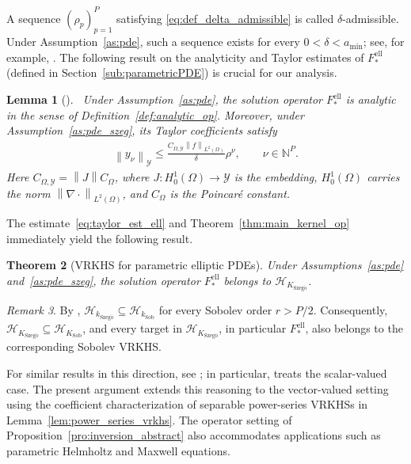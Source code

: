 \documentclass[11pt]{article}
\numberwithin{equation}{section}
\theoremstyle{plain}
\newtheorem{theorem}{Theorem}[section]
\newtheorem{lemma}[theorem]{Lemma}
\theoremstyle{definition}
\theoremstyle{remark}
\newtheorem{remark}[theorem]{Remark}
\newcommand{\Hs}{\mathcal{H}}
\newcommand{\Y}{\mathcal{Y}}
\newcommand{\norm}[1]{\left\lVert#1\right\rVert}
\newcommand{\Fell}{F_{*}^{\mathrm{ell}}}
\begin{document}
A sequence $(\rho_p)_{p=1}^P$ satisfying
\eqref{eq:def_delta_admissible} is called $\delta$-admissible. Under
Assumption~\ref{as:pde}, such a sequence exists for every
$0<\delta<a_{\mathrm{min}}$; see, for example, \cite[Section~3.1]{cohen2011analytic}.
The following result on the analyticity and Taylor estimates of
$\Fell$ (defined in Section~\ref{sub:parametricPDE}) is crucial for our analysis.

\begin{lemma}[{\cite[Section~2]{cohen2011analytic}}]\label{lem:taylor_ell}\
Under Assumption~\ref{as:pde}, the solution operator $\Fell$ is analytic in
the sense of Definition~\ref{def:analytic_op}. Moreover, under
Assumption~\ref{as:pde_szeg}, its Taylor coefficients satisfy
\begin{align}\label{eq:taylor_est_ell}
\norm{y_{\nu}}_{\Y}
\leq
\frac{C_{\Omega,\Y}\norm{f}_{L^2(\Omega)}}{\delta}\rho^\nu,
\qquad \nu\in\mathbb{N}^P.
\end{align}
Here $C_{\Omega,\Y}=\norm{J}C_\Omega$, where $J\colon H_0^1(\Omega)\to\Y$
is the embedding, $H_0^1(\Omega)$ carries the norm $\norm{\nabla\cdot}_{L^2(\Omega)}$, and $C_\Omega$ is the Poincaré constant.
\end{lemma}

The estimate~\eqref{eq:taylor_est_ell} and
Theorem~\ref{thm:main_kernel_op} immediately yield the following result.

\begin{theorem}[VRKHS for parametric elliptic PDEs]
\label{thm:main_kernel_pde}
Under Assumptions~\ref{as:pde} and~\ref{as:pde_szeg}, the solution operator
$F_*^{\mathrm{ell}}$ belongs to $\Hs_{K_{\mathrm{Szeg\ddot{o}}}}$.
\end{theorem}

\begin{remark}\label{rem:sobolev_emb}
By \cite[Lemma~2.1]{griebel2017reproducing},
$\Hs_{k_{\mathrm{Szeg\ddot{o}}}}\subseteq\Hs_{k_{\mathrm{Sob}}}$ for every Sobolev
order $r>P/2$. Consequently,
$\Hs_{K_{\mathrm{Szeg\ddot{o}}}}\subseteq\Hs_{K_{\mathrm{Sob}}}$, and every
target in $\Hs_{K_{\mathrm{Szeg\ddot{o}}}}$, in particular $\Fell$, also belongs
to the corresponding Sobolev VRKHS.
\end{remark}

For similar results in this direction, see
\cite{griebel2017reproducing, schwab2013qmc, rauhut2017compressive}; in
particular, \cite[Lemma~3.3]{griebel2017reproducing} treats the scalar-valued
case. The present argument extends this reasoning to the vector-valued setting
using the coefficient characterization of separable power-series VRKHSs in
Lemma~\ref{lem:power_series_vrkhs}. The operator setting of
Proposition~\ref{pro:inversion_abstract} also accommodates applications such as
parametric Helmholtz and Maxwell equations.
\end{document}
